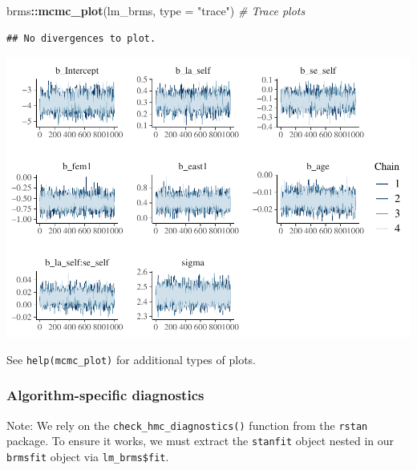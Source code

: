 \documentclass[
  11pt,
]{article}
\newenvironment{Shaded}{\begin{snugshade}}{\end{snugshade}}
\newcommand{\AttributeTok}[1]{\textcolor[rgb]{0.13,0.29,0.53}{#1}}
\newcommand{\CommentTok}[1]{\textcolor[rgb]{0.56,0.35,0.01}{\textit{#1}}}
\newcommand{\FunctionTok}[1]{\textcolor[rgb]{0.13,0.29,0.53}{\textbf{#1}}}
\newcommand{\NormalTok}[1]{#1}
\newcommand{\SpecialCharTok}[1]{\textcolor[rgb]{0.81,0.36,0.00}{\textbf{#1}}}
\newcommand{\StringTok}[1]{\textcolor[rgb]{0.31,0.60,0.02}{#1}}
\begin{document}
\begin{Shaded}
\begin{Highlighting}[]
\NormalTok{brms}\SpecialCharTok{::}\FunctionTok{mcmc\_plot}\NormalTok{(lm\_brms, }\AttributeTok{type =} \StringTok{"trace"}\NormalTok{) }\CommentTok{\# Trace plots}
\end{Highlighting}
\end{Shaded}

\begin{verbatim}
## No divergences to plot.
\end{verbatim}

\includegraphics{02-02-lec_files/figure-latex/brms-visual-3.pdf}

See \texttt{help(mcmc\_plot)} for additional types of plots.

\hypertarget{algorithm-specific-diagnostics}{%
\subsubsection{Algorithm-specific diagnostics}\label{algorithm-specific-diagnostics}}

Note: We rely on the \texttt{check\_hmc\_diagnostics()} function from the \texttt{rstan} package. To ensure it works, we must extract the \texttt{stanfit} object nested in our \texttt{brmsfit} object via \texttt{lm\_brms\$fit}.

\begin{Shaded}
\end{Shaded}
\end{document}
